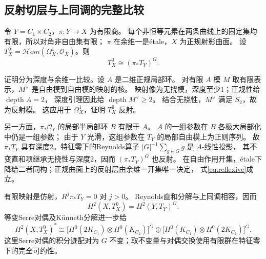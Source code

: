 \documentclass[UTF8,a4paper,11pt,fontset=fandol]{ctexart}
\numberwithin{equation}{section}
\theoremstyle{definition}
\begin{document}
\subsection{反射切层与上同调的完整比较}
令 $Y=C_1\times C_2$，$\pi:Y\to X$ 为有限商。
每个非恒等元素在两条曲线上的固定集均有限，所以对角非自由集有限；
$\pi$ 在余维一是\'etale，$X$ 为正规射影曲面。
设 $T_X^0=\mathcal Hom(\Omega_X^1,\mathcal O_X)$。则
\begin{equation}\label{eq:reflexive}
T_X^0\cong(\pi_*T_Y)^G.
\end{equation}

证明分为深度与余维一比较。设 $A$ 是二维正规局部环。
对有限 $A$ 模 $M$ 取有限表示，$M^\vee$ 是自由模到自由模的映射的核。
映射像为无挠模，深度至少1；正规性给 $\operatorname{depth}A=2$，
深度引理因此给 $\operatorname{depth}M^\vee\ge2$。
结合无挠性，$M^\vee$ 满足 $S_2$，故为反射模。
这应用于 $\Omega_X^1$，证明 $T_X^0$ 反射。

另一方面，$\pi_*\mathcal O_Y$ 的局部半局部环 $B$ 有限于 $A$。
$A$ 的一组参数在 $B$ 各极大局部化中仍是一组参数；
由于 $Y$ 光滑，这组参数在 $T_Y$ 的局部自由模上为正则序列。
故 $\pi_*T_Y$ 具有深度2。特征零下的Reynolds算子
$|G|^{-1}\sum_{g\in G}g$ 是 $A$-线性投影，
其不变直和项继承无挠性与深度2，因而 $(\pi_*T_Y)^G$ 也反射。
在自由作用开集，\'etale下降给二者同构；正规曲面上的反射层由余维一开集唯一决定，
式\eqref{eq:reflexive}成立。

有限映射是仿射，$R^j\pi_*T_Y=0$ 对 $j>0$。
Reynolds直和分解与上同调相容，因而
\[
H^2(X,T_X^0)=H^2(Y,T_Y)^G.
\]
等变Serre对偶及K\"unneth分解进一步给
\begin{equation}\label{eq:qg-obstruction}
H^2(X,T_X^0)^*\cong
\bigl[H^0(2K_{C_1})\otimes H^0(K_{C_2})\bigr]^G
\oplus
\bigl[H^0(K_{C_1})\otimes H^0(2K_{C_2})\bigr]^G.
\end{equation}
这里Serre对偶的积分迹配对为 $G$ 不变；取不变量与对偶交换使用有限群在特征零下的完全可约性。
\end{document}
